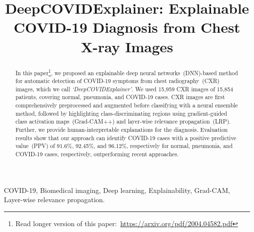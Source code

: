 \documentclass[conference]{IEEEtran}
\begin{document}

\title{DeepCOVIDExplainer: Explainable COVID-19 Diagnosis from Chest X-ray Images}

\author{
}

\maketitle

\begin{abstract}
    In this paper\footnote{Read longer version of this paper:~\url{https://arxiv.org/pdf/2004.04582.pdf}}, we proposed an explainable deep neural networks~(DNN)-based method for automatic detection of COVID-19 symptoms from chest radiography~(CXR) images, which we call \emph{`DeepCOVIDExplainer'}. We used 15,959 CXR images of 15,854 patients, covering normal, pneumonia, and COVID-19 cases. CXR images are first comprehensively preprocessed and augmented before classifying with a neural ensemble method, followed by highlighting class-discriminating regions using gradient-guided class activation maps~(Grad-CAM++) and layer-wise relevance propagation~(LRP). Further, we provide human-interpretable explanations for the diagnosis. Evaluation results show that our approach can identify COVID-19 cases 
    with a positive predictive value~(PPV) of 91.6\%, 92.45\%, and 96.12\%, respectively for normal, pneumonia, and COVID-19 cases, respectively, 
    outperforming recent approaches. %
\end{abstract}
\begin{IEEEkeywords} COVID-19, Biomedical imaging, Deep learning, Explainability, Grad-CAM, Layer-wise relevance propagation.\end{IEEEkeywords}
\end{document}
